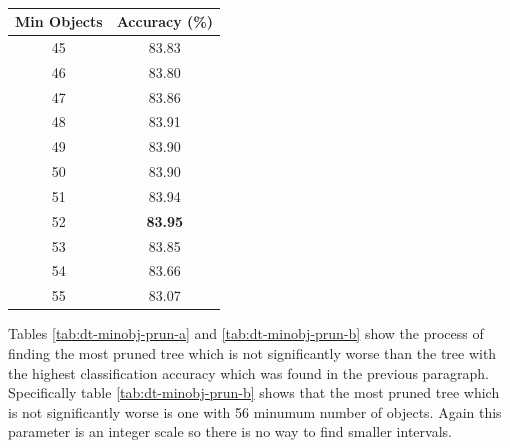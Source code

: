 \documentclass[12pt]{article}
\begin{document}
\begin{table}[H]
\begin{subtable}{.5\linewidth}
          \centering
          \caption{}
          \begin{tabular}{c|c}
            \toprule
            \multicolumn{1}{l|}{Min Objects} & \multicolumn{1}{l}{Accuracy (\%)} \\
            \midrule
            45    & 83.83 \\
            46    & 83.80 \\
            47    & 83.86 \\
            48    & 83.91 \\
            49    & 83.90 \\
            50    & 83.90 \\
            51    & 83.94 \\
            52    & \textbf{83.95} \\
            53    & 83.85 \\
            54    & 83.66 \\
            55    & 83.07 \\
            \bottomrule
            \end{tabular}
          \label{tab:dt-minobj-b}
        \end{subtable}
        \label{tab:dt-minobj}
      \end{table}
      \doublespacing

      Tables \ref{tab:dt-minobj-prun-a} and \ref{tab:dt-minobj-prun-b} show the process of finding the most pruned tree which is not significantly worse than the tree with the highest classification accuracy which was found in the previous paragraph. Specifically table \ref{tab:dt-minobj-prun-b} shows that the most pruned tree which is not significantly worse is one with 56 minumum number of objects. Again this parameter is an integer scale so there is no way to find smaller intervals.
\end{document}
